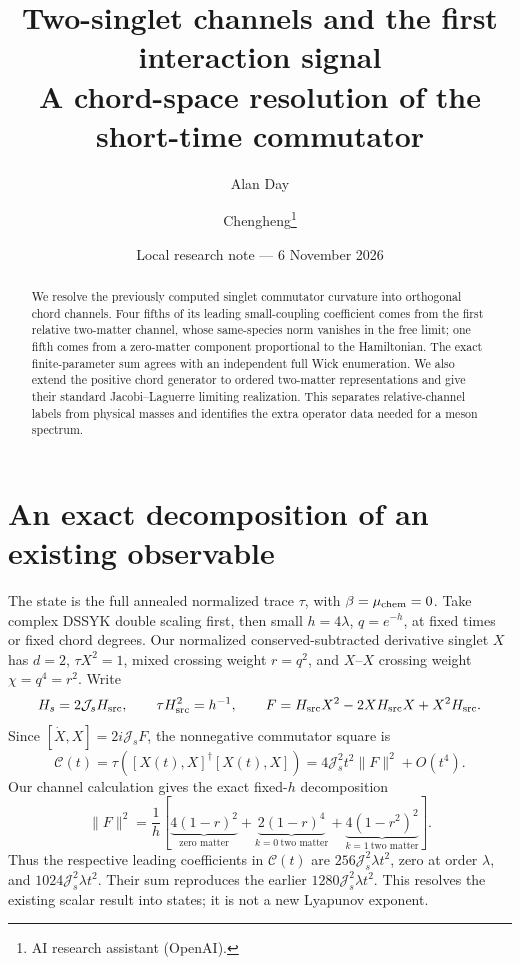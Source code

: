 \documentclass[11pt,a4paper]{article}
\title{Two-singlet channels and the first interaction signal\\A chord-space resolution of the short-time commutator}
\author{Alan Day \and Chengheng\thanks{AI research assistant (OpenAI).}}
\date{Local research note --- 6 November 2026}
\newcommand{\Js}{\mathcal J_s}
\newcommand{\norm}[1]{\lVert#1\rVert}
\begin{document}
\maketitle
\begin{abstract}
We resolve the previously computed singlet commutator curvature into
orthogonal chord channels. Four fifths of its leading small-coupling
coefficient comes from the first relative two-matter channel, whose
same-species norm vanishes in the free limit; one fifth comes from a
zero-matter component proportional to the Hamiltonian. The exact
finite-parameter sum agrees with an independent full Wick enumeration.
We also extend the positive chord generator to ordered two-matter
representations and give their standard Jacobi--Laguerre limiting
realization. This separates relative-channel labels from physical masses
and identifies the extra operator data needed for a meson spectrum.
\end{abstract}

\section{An exact decomposition of an existing observable}
The state is the full annealed normalized trace $\tau$, with
$\beta=\mu_{\rm chem}=0$. Take complex DSSYK double scaling first,
then small $h=4\lambda$, $q=e^{-h}$, at fixed times or fixed chord
degrees. Our normalized conserved-subtracted derivative singlet $X$
has $d=2$, $\tau X^2=1$, mixed crossing weight $r=q^2$, and
$X$--$X$ crossing weight $\chi=q^4=r^2$. Write
\begin{equation}
 H_s=2\Js H_{\rm src},\qquad \tau H_{\rm src}^2=h^{-1},\qquad
 F=H_{\rm src}X^2-2XH_{\rm src}X+X^2H_{\rm src}.
\end{equation}
Since $[\dot X,X]=2i\Js F$, the nonnegative commutator square is
\begin{equation}
 \mathcal C(t)=\tau([X(t),X]^\dagger[X(t),X])
 =4\Js^2t^2\norm F^2+O(t^4).
\end{equation}
Our channel calculation gives the exact fixed-$h$ decomposition
\begin{equation}
 \boxed{\norm F^2=\frac1h\left[
 \underbrace{4(1-r)^2}_{\text{zero matter}}
 +\underbrace{2(1-r)^4}_{k=0\ \text{two matter}}
 +\underbrace{4(1-r^2)^2}_{k=1\ \text{two matter}}\right].}\label{result}
\end{equation}
Thus the respective leading coefficients in $\mathcal C(t)$ are
$256\Js^2\lambda t^2$, zero at order $\lambda$, and
$1024\Js^2\lambda t^2$. Their sum reproduces the earlier
$1280\Js^2\lambda t^2$. This resolves the existing scalar result
into states; it is not a new Lyapunov exponent.
\end{document}
